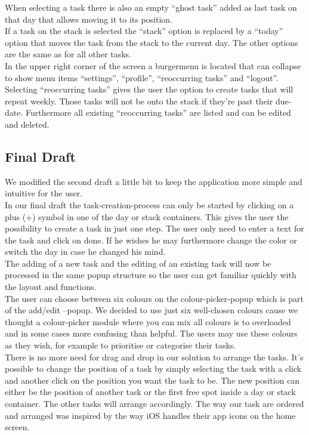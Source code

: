 When selecting a task there is also an empty “ghost task” added as last task on that day that allows moving it to its position. \\
If a task on the stack is selected the “stack” option is replaced by a “today” option that moves the task from the stack to the current day. The other options are the same as for all other tasks. \\
In the upper right corner of the screen a burgermenu is located that can collapse to show menu items “settings”, “profile”, “reoccurring tasks” and “logout”. \\
Selecting “reoccurring tasks” gives the user the option to create tasks that will repeat weekly. 
Those tasks will not be onto the stack if they’re past their due-date. 
Furthermore all existing “reoccurring tasks” are listed and can be edited and deleted. 

\subsection{Final Draft}

We modified the second draft a little bit to keep the application more simple and intuitive for the user. \\
In our final draft the task-creation-process can only be started by clicking on a plus (+) symbol in one of the day or stack containers. This gives the user the possibility to create a task in just one step. The user only need to enter a text for the task and click on done. If he wishes he may furthermore change the color or switch the day in case he changed his mind. \\
The adding of a new task and the editing of an existing task will now be processed in the same popup structure so the user can get familiar quickly with the layout and functions. \\
The user can choose between six colours on the colour-picker-popup which is part of the add/edit –popup. We decided to use just six well-chosen colours cause we thought a colour-picker module where you can mix all colours is to overloaded and in some cases more confusing than helpful. The users may use these colours as they wish, for example to prioritise or categorise their tasks. \\
There is no more need for drag and drop in our solution to arrange the tasks. It’s possible to change the position of a task by simply selecting the task with a click and another click on the position you want the task to be. The new position can either be the position of another task or the first free spot inside a day or stack container.  The other tasks will arrange accordingly. The way our task are ordered and arranged was inspired by the way iOS handles their app icons on the home screen. 



